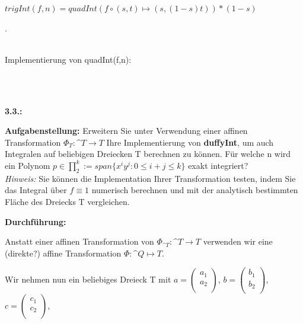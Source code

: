 \documentclass[a4paper,11pt,bibliography=totoc,listof=totoc,headinclude=true,cleardoublepage=empty,oneside]{scrbook}
\begin{document}
	\centerline{$trigInt(f,n) = quadInt(f\circ(s,t) \mapsto (s,(1-s)t))*(1-s)$} \color{change2}.
	
	\vspace{-1mm}	
		
		\\[12pt]
		\color{change2}
		Implementierung von quadInt(f,n):
\color{change}
		\lstset{ 
			language=Matlab, 
			showstringspaces=false}
		
		 
		\begin{lstlisting} 
		
		
		\end{lstlisting}
		
	\color{change2}
		
		
		\item \textbf{\Large{3.3.:}}\linebreak
		\vspace{1mm}
		
		\textbf{Aufgabenstellung:}	 \linebreak
		 Erweitern Sie unter Verwendung einer affinen Transformation $ \Phi_T:\^{T} \to T$ Ihre Implementierung von \textbf{duffyInt}, um auch Integralen auf beliebigen Dreiecken T berechnen zu können. 
		Für welche n wird ein Polynom $ p \in \prod_{2}^k:=span\{x^iy^j:0 \leq i+j\leq k \} $ exakt integriert? \\
		
		\vspace{-3mm}
		\textit{Hinweis:} Sie können die Implementation Ihrer Transformation testen, indem Sie das Integral über $f \equiv1$ numerisch berechnen und mit der analytisch bestimmten Fläche des Dreiecks T vergleichen.
		
		\vspace{5mm}
		\textbf{Durchführung:}
		
		Anstatt einer affinen Transformation von $ \Phi_{\^{T}}:\^{T} \to T$ verwenden wir eine (direkte?) affine Transformation $\Phi:\^{Q} \mapsto T$.
		
		Wir nehmen nun ein beliebiges Dreieck T mit $a=\left(
		\begin{array}{ccc}
		a_1 \\
		a_2\\
		\end{array}
		\right)$, $b=\left(
		\begin{array}{ccc}
			b_1 \\
			b_2\\
		\end{array}
		\right)$, $c=\left(
		\begin{array}{ccc}
			c_1 \\
			c_2\\
		\end{array}
		\right)$, 
		\vspace{3mm}
		
\end{document}
